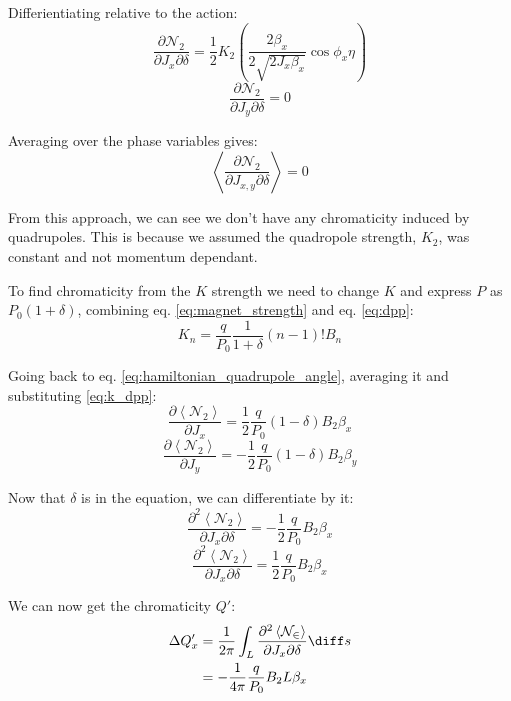 Differientiating relative to the action:
\begin{equation}\frac{\partial \mathcal{N_2}}{\partial J_x \partial \delta} =  \frac{1}{2} K_2 \left (\frac{2 \beta_x}{2 \sqrt{2 J_x \beta_x}} \cos \phi_x \eta \right) \end{equation}
\begin{equation}\frac{\partial \mathcal{N_2}}{\partial J_y \partial \delta} = 0\end{equation}

Averaging over the phase variables gives:
\begin{equation}\left< \frac{\partial \mathcal{N_2}}{\partial J_{x,y} \partial \delta} \right> = 0\end{equation}

From this approach, we can see we don't have any chromaticity induced by
quadrupoles. This is because we assumed the quadropole strength,
\(K_2\), was constant and not momentum dependant.

To find chromaticity from the \(K\) strength we need to change \(K\) and
express \(P\) as \(P_0(1 + \delta)\), combining eq.
\ref{eq:magnet_strength} and eq. \ref{eq:dpp}:
\begin{equation}K_n = \frac{q}{P_0} \frac{1}{1 + \delta} (n - 1)! B_n\label{eq:k_dpp}\end{equation}

Going back to eq. \ref{eq:hamiltonian_quadrupole_angle}, averaging it
and substituting \ref{eq:k_dpp}:
\begin{equation}\frac{\partial \left< \mathcal{N_2} \right>}{\partial J_x} = \frac{1}{2} \frac{q}{P_0} (1 - \delta) B_2 \beta_x\end{equation}
\begin{equation}\frac{\partial \left< \mathcal{N_2} \right>}{\partial J_y} = - \frac{1}{2} \frac{q}{P_0} (1 - \delta) B_2 \beta_y\end{equation}

Now that \(\delta\) is in the equation, we can differentiate by it:
\begin{equation}\frac{\partial^2 \left< \mathcal{N_2} \right>}{\partial J_x \partial \delta}  = - \frac{1}{2} \frac{q}{P_0} B_2 \beta_x\end{equation}
\begin{equation}\frac{\partial^2 \left< \mathcal{N_2} \right>}{\partial J_x \partial \delta}  = \frac{1}{2} \frac{q}{P_0} B_2 \beta_x\end{equation}

We can now get the chromaticity \(Q'\): \begin{equation}\begin{aligned}
\Delta Q'_x &= \frac{1}{2\pi} \int_L \frac{\partial^2 \left< \mathcal{N_2} \right> }{\partial J_x \partial \delta} \diff s \\
  & = - \frac{1}{4 \pi} \frac{q}{P_0} B_2 L \beta_x
\end{aligned}\end{equation}

